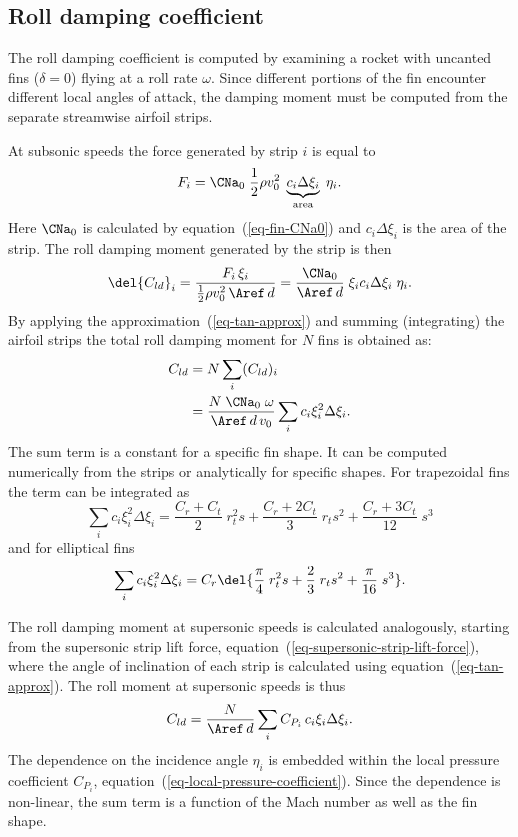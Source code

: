 \subsection{Roll damping coefficient}

The roll damping coefficient is computed by examining a rocket with
uncanted fins ($\delta=0$) flying at a roll rate $\omega$.  Since
different portions of the fin encounter different local angles of
attack, the damping moment must be computed from the separate
streamwise airfoil strips.

At subsonic speeds the force generated by strip $i$ is equal to
%
\begin{equation}
F_i = \CNa_0 \; \frac{1}{2}\rho v_0^2 \; 
\underbrace{c_i \Delta\xi_i}_{\rm area} \; \eta_i.
\end{equation}
%
Here $\CNa_0$ is calculated by equation~(\ref{eq-fin-CNa0}) and 
$c_i \Delta\xi_i$ is the area of the strip.  The roll damping moment
generated by the strip is then
%
\begin{equation}
\del{C_{ld}}_i
  = \frac{F_i\,\xi_i}{\frac{1}{2}\rho v_0^2\,\Aref\, d}
  = \frac{\CNa_0}{\Aref\,d} \; \xi_i c_i\Delta\xi_i \; \eta_i.
\end{equation}
%
By applying the approximation~(\ref{eq-tan-approx}) and summing
(integrating) the airfoil strips the total roll damping moment for $N$
fins is obtained as:
%
\begin{align}
C_{ld} & = N \sum_i (C_{ld})_i \nonumber \\
& = \frac{N \;\CNa_0\;\omega}{\Aref\,d\,v_0} \sum_i c_i\xi_i^2\Delta\xi_i.
\label{eq-roll-damping-moment}
\end{align}
%
The sum term is a constant for a specific fin shape.  It can be
computed numerically from the strips or analytically for specific
shapes.  For trapezoidal fins the term can be integrated as
%
\begin{equation}
\sum_i c_i\xi_i^2\Delta\xi_i = 
\frac{C_r+C_t}{2}\;r_t^2s + \frac{C_r+2C_t}{3}\;r_ts^2 + 
\frac{C_r+3C_t}{12}\;s^3
\end{equation}
%
and for elliptical fins
%
\begin{equation}
\sum_i c_i\xi_i^2\Delta\xi_i = 
C_r \del{ \frac{\pi}{4}\;r_t^2s + \frac{2}{3}\;r_ts^2 +
  \frac{\pi}{16}\;s^3 }.
\end{equation}


The roll damping moment at supersonic speeds is calculated
analogously, starting from the supersonic strip lift force,
equation~(\ref{eq-supersonic-strip-lift-force}), where the angle of
inclination of each strip is calculated using
equation~(\ref{eq-tan-approx}).  The roll moment at supersonic speeds
is thus
%
\begin{equation}
C_{ld} = \frac{N}{\Aref\,d} \sum_i C_{P_i}\, c_i \xi_i \Delta \xi_i.
\end{equation}
%
The dependence on the incidence angle $\eta_i$ is embedded within the
local pressure coefficient $C_{P_i}$,
equation~(\ref{eq-local-pressure-coefficient}).  Since the dependence
is non-linear, the sum term is a function of the Mach number as well
as the fin shape.




